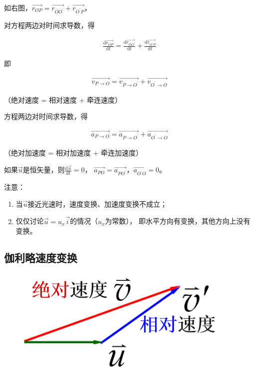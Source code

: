 \documentclass[
	12pt, %
	fleqn, %
	a4paper, %
]{myLegrandOrangeBook}
\newcommand{\rmd}{\mathrm{d}}
\newcommand{\deriv}[2]{\frac{\rmd #1}{\rmd #2}}
\begin{document}
    如右图，\(\overrightarrow{r_{OP}} = \overrightarrow{r_{OO^{'}}} + \overrightarrow{r_{O^{'}P}}\)，

    对方程两边对时间求导数，得

    \begin{align*}
        \deriv{\overrightarrow{r_{OP}}}{t} = \deriv{\overrightarrow{r_{OO^{'}}}}{t} +
        \deriv{\overrightarrow{r_{O^{'}P}}}{t}
    \end{align*}

    即

    \begin{align}
        \overrightarrow{v_{P \rightarrow O}} = \overrightarrow{v_{P \rightarrow O^{'}}} +
        \overrightarrow{v_{O^{'} \rightarrow O}}
    \end{align}

    （绝对速度 = 相对速度 + 牵连速度）

    方程两边对时间求导数，得

    \begin{align}
        \overrightarrow{a_{P \rightarrow O}} = \overrightarrow{a_{P \rightarrow O^{'}}} +
        \overrightarrow{a_{O^{'} \rightarrow O}}
    \end{align}

    （绝对加速度 = 相对加速度 + 牵连加速度）

    如果\(\overrightarrow{u}\)是恒矢量，则\(\deriv{\overrightarrow{u}}{t} = 0\)，
    \(\overrightarrow{a_{PO}} = \overrightarrow{a_{PO^{'}}}\)，\(\overrightarrow{a_{O^{'}O}} = 0\)。

    注意：

    \begin{enumerate}
        \item 当\(\overrightarrow{u}\)接近光速时，速度变换、加速度变换不成立；
        \item 仅仅讨论\(\overrightarrow{u} = u_x \overrightarrow{i}\)的情况（\(u_x\)为常数），
        即水平方向有变换，其他方向上没有变换。
    \end{enumerate}

\subsection{伽利略速度变换}

    \begin{figure}
        \centering
        \includegraphics[scale=0.4]{"Chapter 01 images/pic9.png"}
        \label{pic9}
    \end{figure}
\end{document}
